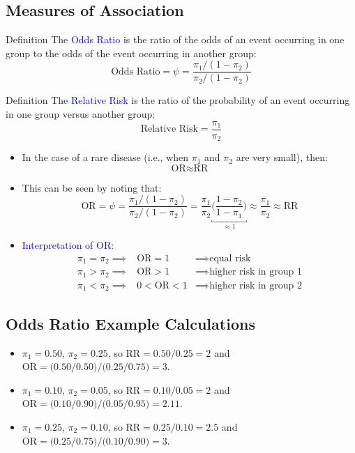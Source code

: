 \documentclass[oneside]{book}\usepackage[]{graphicx}\usepackage[svgnames]{xcolor}
\begin{document}
\subsection*{Measures of Association}
\begin{Regular}{Definition}
    The \textcolor{Blue}{Odds Ratio} is the ratio of the odds of an event occurring in one group to the odds
    of the event occurring in another group:
    \[ \text{Odds Ratio}=\psi=\frac{\pi_1/(1-\pi_2)}{\pi_2/(1-\pi_2)} \]
\end{Regular}
\begin{Regular}{Definition}
    The \textcolor{Blue}{Relative Risk} is the ratio of the probability of an event occurring in one group
    versus another group:
    \[ \text{Relative Risk}=\frac{\pi_1}{\pi_2} \]
\end{Regular}
\begin{itemize}
    \item In the case of a rare disease (i.e., when $ \pi_1 $ and $ \pi_2 $ are very small), then:
          \[ \text{OR}\approx \text{RR} \]
    \item This can be seen by noting that:
          \[ \text{OR}=\psi=\frac{\pi_1/(1-\pi_2)}{\pi_2/(1-\pi_2)}=\frac{\pi_1}{\pi_2} \underbracket{\biggl(\frac{1-\pi_2}{1-\pi_1}\biggr)}_{\approx 1}\approx \frac{\pi_1}{\pi_2} \approx \text{RR}  \]
    \item \textcolor{Blue}{Interpretation of OR}:
          \[ \begin{array}{lcl}
                  \pi_1=\pi_2  \implies & \text{OR}=1   & \implies  \text{equal risk}             \\
                  \pi_1>\pi_2  \implies & \text{OR}>1   & \implies  \text{higher risk in group 1} \\
                  \pi_1<\pi_2  \implies & 0<\text{OR}<1 & \implies  \text{higher risk in group 2}
              \end{array} \]
\end{itemize}
\subsection*{Odds Ratio Example Calculations}
\begin{Example}{}
    \begin{itemize}
        \item $ \pi_1=0.50 $, $ \pi_2=0.25 $, so $ \text{RR}=0.50/0.25=2 $ and $ \text{OR}=\bigl(0.50/0.50\bigr)/\bigl(0.25/0.75\bigr)=3 $.
        \item $ \pi_1=0.10 $, $ \pi_2=0.05 $, so $ \text{RR}=0.10/0.05=2 $ and $ \text{OR}=\bigl(0.10/0.90\bigr)/\bigl(0.05/0.95\bigr)=2.11 $.
        \item  $ \pi_1=0.25 $, $ \pi_2=0.10 $, so $ \text{RR}=0.25/0.10=2.5 $ and $ \text{OR}=\bigl(0.25/0.75\bigr)/\bigl(0.10/0.90\bigr)=3 $.
    \end{itemize}
\end{Example}
\end{document}
